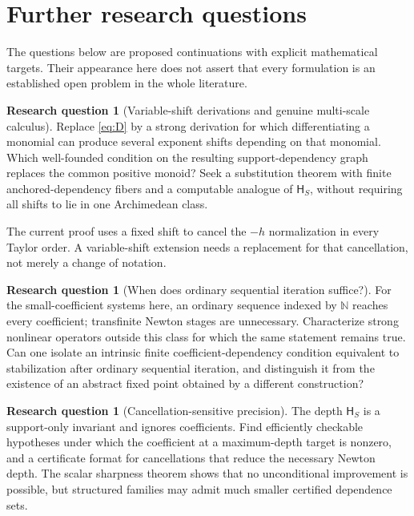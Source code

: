 \documentclass[11pt,a4paper]{article}
\theoremstyle{definition}
\newtheorem{question}[theorem]{Research question}
\theoremstyle{remark}
\newcommand{\N}{\mathbb N}
\newcommand{\depth}{\mathsf H}
\begin{document}
\section{Further research questions}
\label{sec:questions}

The questions below are proposed continuations with explicit mathematical
targets. Their appearance here does not assert that every formulation is
an established open problem in the whole literature.

\begin{question}[Variable-shift derivations and genuine multi-scale calculus]
Replace \eqref{eq:D} by a strong derivation for which differentiating a
monomial can produce several exponent shifts depending on that monomial.
Which well-founded condition on the resulting support-dependency graph
replaces the common positive monoid? Seek a substitution theorem with
finite anchored-dependency fibers and a computable analogue of
$\depth_S$, without requiring all shifts to lie in one Archimedean class.
\end{question}
The current proof uses a fixed shift to cancel the $-h$ normalization in
every Taylor order. A variable-shift extension needs a replacement for that
cancellation, not merely a change of notation.

\begin{question}[When does ordinary sequential iteration suffice?]
For the small-coefficient systems here, an ordinary sequence indexed by
$\N$ reaches every coefficient; transfinite Newton stages are unnecessary.
Characterize strong nonlinear operators outside this class for which the
same statement remains true. Can one isolate an intrinsic finite
coefficient-dependency condition equivalent to stabilization after ordinary
sequential iteration, and distinguish it from the existence of an abstract
fixed point obtained by a different construction?
\end{question}

\begin{question}[Cancellation-sensitive precision]
The depth $\depth_S$ is a support-only invariant and ignores coefficients.
Find efficiently checkable hypotheses under which the coefficient at a
maximum-depth target is nonzero, and a certificate format for cancellations
that reduce the necessary Newton depth. The scalar sharpness theorem shows
that no unconditional improvement is possible, but structured families
may admit much smaller certified dependence sets.
\end{question}
\end{document}
